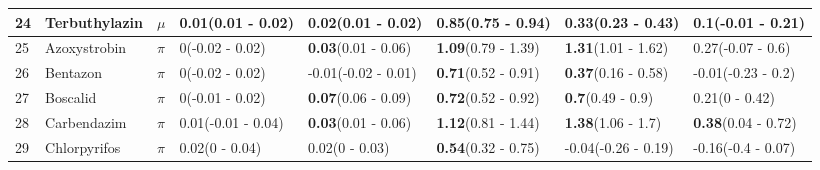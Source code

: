 \begin{longtable}{lp{2cm}p{0.7cm}p{2cm}p{2cm}p{2cm}p{2cm}p{2cm}}
  24 & Terbuthylazin & $\mu$ & \textbf{0.01}\newline (0.01 - 0.02) & \textbf{0.02}\newline (0.01 - 0.02) & \textbf{0.85}\newline (0.75 - 0.94) & \textbf{0.33}\newline (0.23 - 0.43) & 0.1\newline (-0.01 - 0.21) \\ 
   \midrule
25 & Azoxystrobin & $\pi$ & 0\newline (-0.02 - 0.02) & \textbf{0.03}\newline (0.01 - 0.06) & \textbf{1.09}\newline (0.79 - 1.39) & \textbf{1.31}\newline (1.01 - 1.62) & 0.27\newline (-0.07 - 0.6) \\ 
  26 & Bentazon & $\pi$ & 0\newline (-0.02 - 0.02) & -0.01\newline (-0.02 - 0.01) & \textbf{0.71}\newline (0.52 - 0.91) & \textbf{0.37}\newline (0.16 - 0.58) & -0.01\newline (-0.23 - 0.2) \\ 
  27 & Boscalid & $\pi$ & 0\newline (-0.01 - 0.02) & \textbf{0.07}\newline (0.06 - 0.09) & \textbf{0.72}\newline (0.52 - 0.92) & \textbf{0.7}\newline (0.49 - 0.9) & 0.21\newline (0 - 0.42) \\ 
  28 & Carbendazim & $\pi$ & 0.01\newline (-0.01 - 0.04) & \textbf{0.03}\newline (0.01 - 0.06) & \textbf{1.12}\newline (0.81 - 1.44) & \textbf{1.38}\newline (1.06 - 1.7) & \textbf{0.38}\newline (0.04 - 0.72) \\ 
  29 & Chlorpyrifos & $\pi$ & 0.02\newline (0 - 0.04) & 0.02\newline (0 - 0.03) & \textbf{0.54}\newline (0.32 - 0.75) & -0.04\newline (-0.26 - 0.19) & -0.16\newline (-0.4 - 0.07) \\ 

\end{longtable}
